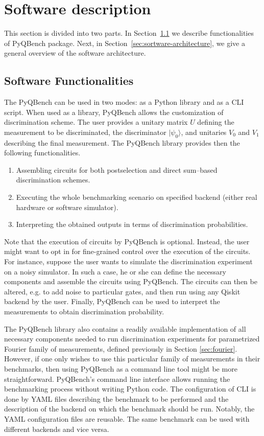 \documentclass[preprint,12pt, a4paper, dvipsnames]{elsarticle}
\newcommand{\ket}[1]{\ensuremath{|#1\rangle}}
\newcommand{\1}{{\rm 1\hspace{-0.9mm}l}}
\theoremstyle{definition}
\begin{document}
 \section{Software description}
 \label{}
 This section is divided into two parts.
 In Section~\ref{sec:sortware-functionalities} we describe functionalities of PyQBench
 package. Next, in Section~\ref{sec:sortware-architecture}, we give a general overview of the
 software architecture.


\subsection{Software Functionalities}\label{sec:sortware-functionalities}

The PyQBench can be used in two modes: as a Python library and as a CLI script. When used as a
library, PyQBench allows the customization of discrimination scheme. The user provides
a unitary matrix $U$ defining the measurement to be discriminated, the discriminator $\ket{\psi_0}$,
and unitaries $V_0$ and $V_1$ describing the final measurement. The PyQBench library provides then
the following functionalities.

\begin{enumerate}
	\item Assembling circuits for both postselection and direct sum--based discrimination schemes.
	\item Executing the whole benchmarking scenario on specified backend (either real hardware or
	software simulator).
	\item Interpreting the obtained outputs in terms of discrimination probabilities.
\end{enumerate}
Note that the execution of circuits by PyQBench is optional. Instead, the user might want to opt in for
fine-grained control over the execution of the circuits. For instance, suppose the user wants to
simulate the discrimination experiment on a noisy simulator. In such a case, he or she can define
the necessary components and assemble the circuits using PyQBench. The circuits can then be altered,
e.g. to add noise to particular gates, and then run using any Qiskit backend by the user. Finally,
PyQBench can be used to interpret the measurements to obtain discrimination probability.

The PyQBench library also contains a readily available implementation of all necessary components
needed to run discrimination experiments for parametrized Fourier family of measurements, defined
previously in Section \ref{sec:fourier}. However, if one only wishes to use this particular family
of measurements in their benchmarks, then using PyQBench as a command line tool might be more straightforward. PyQBench's command line interface allows running the benchmarking process without
writing Python code. The configuration of CLI is done by YAML \cite{yaml} files describing the benchmark
to be performed and the description of the backend on which the benchmark should be run. Notably,
the YAML configuration files are reusable. The same benchmark can be used with different backends
and vice versa.
\end{document}
